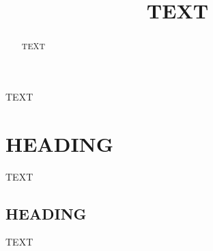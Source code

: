\documentclass[journal abbreviation, manuscript]{copernicus}
\begin{document}
\title{TEXT}



\Author[][EMAIL]{}{} %
\Author[]{}{}
\Author[]{}{}












\received{}
\pubdiscuss{} %
\revised{}
\accepted{}
\published{}




\maketitle



\begin{abstract}
TEXT
\end{abstract}




\introduction  %
TEXT


\section{HEADING}
TEXT


\subsection{HEADING}
TEXT
\end{document}
